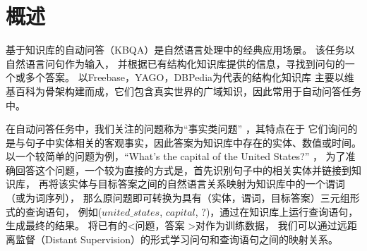 
\section{概述}%
\label{sec:compqa-intro}


基于知识库的自动问答（KBQA）是自然语言处理中的经典应用场景。
该任务以自然语言问句作为输入，
并根据已有结构化知识库提供的信息，寻找到问句的一个或多个答案。
以Freebase，YAGO，DBPedia为代表的结构化知识库
主要以维基百科为骨架构建而成，它们包含真实世界的广域知识，因此常用于自动问答任务中。



在自动问答任务中，我们关注的问题称为``{事实类问题}'' ，其特点在于
它们询问的是与句子中实体相关的客观事实，因此答案为知识库中存在的实体、数值或时间。
以一个较简单的问题为例，``What's the capital of the United States?'' ，
为了准确回答这个问题，一个较为直接的方式是，首先识别句子中的相关实体并链接到知识库，
再将该实体与目标答案之间的自然语言关系映射为知识库中的一个谓词（或为词序列），
那么原问题即可转换为具有（实体，谓词，目标答案）三元组形式的查询语句，
例如($united\_states$, $capital$, $?$)，通过在知识库上运行查询语句，生成最终的结果。
将已有的\textless 问题，答案 \textgreater 对作为训练数据，
我们可以通过远距离监督（Distant Supervision）的形式学习问句和查询语句之间的映射关系。



